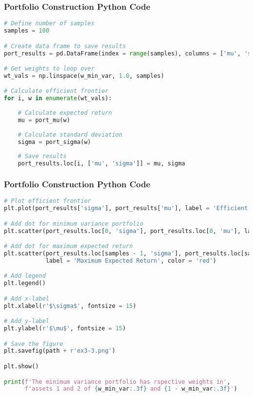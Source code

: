 \documentclass{beamer}
\begin{document}
\begin{frame}[fragile]
\frametitle{Portfolio Construction Python Code}

\begin{lstlisting}[language=Python]
# Define number of samples
samples = 100

# Create data frame to save results
port_results = pd.DataFrame(index = range(samples), columns = ['mu', 'sigma'])

# Get weights to loop over
wt_vals = np.linspace(w_min_var, 1.0, samples)

# Calculate efficient frontier
for i, w in enumerate(wt_vals):
    
    # Calculate expected return
    mu = port_mu(w)
    
    # Calculate standard deviation
    sigma = port_sigma(w)
    
    # Save results
    port_results.loc[i, ['mu', 'sigma']] = mu, sigma
\end{lstlisting}

\end{frame}

\begin{frame}[fragile]
\frametitle{Portfolio Construction Python Code}

\begin{lstlisting}[language=Python]
# Plot efficient frontier
plt.plot(port_results['sigma'], port_results['mu'], label = 'Efficient Frontier')

# Add dot for minimum variance portfolio
plt.scatter(port_results.loc[0, 'sigma'], port_results.loc[0, 'mu'], label = 'Minimum Variance', color = 'green')

# Add dot for maximum expected return
plt.scatter(port_results.loc[samples - 1, 'sigma'], port_results.loc[samples - 1, 'mu'], 
            label = 'Maximum Expected Return', color = 'red')

# Add legend
plt.legend()

# Add x-label
plt.xlabel(r'$\sigma$', fontsize = 15)

# Add y-label
plt.ylabel(r'$\mu$', fontsize = 15)

# Save the figure
plt.savefig(path + r'ex3-3.png')

plt.show()

print(f'The minimum variance portfolio has rspective weights in', 
      f'assets 1 and 2 of {w_min_var:.3f} and {1 - w_min_var:.3f}')
\end{lstlisting}

\end{frame}
\end{document}
